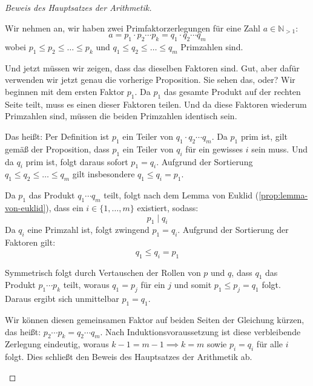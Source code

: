 \begin{proof}[Beweis des Hauptsatzes der Arithmetik]
\begin{math-stroke}
Wir nehmen an, wir haben zwei Primfaktorzerlegungen für eine Zahl $a \in \mathbb{N}_{>1}$:
\begin{equation}\label{eq:eindeutigkeit-ansatz-p3}
a = p_1 \cdot p_2 \cdots p_k = q_1 \cdot q_2 \cdots q_m
\end{equation}
wobei $p_1 \le p_2 \le \dots \le p_k$ und $q_1 \le q_2 \le \dots \le q_m$ Primzahlen sind.
\end{math-stroke}

\begin{spoken-clean}[00:53:43 - 00:56:08]
Und jetzt müssen wir zeigen, dass das dieselben Faktoren sind. Gut, aber dafür verwenden wir jetzt genau die vorherige Proposition. Sie sehen das, oder? Wir beginnen mit dem ersten Faktor $p_1$. Da $p_1$ das gesamte Produkt auf der rechten Seite teilt, muss es einen dieser Faktoren teilen. Und da diese Faktoren wiederum Primzahlen sind, müssen die beiden Primzahlen identisch sein.

Das heißt: Per Definition ist $p_1$ ein Teiler von $q_1 \cdot q_2 \cdots q_m$. Da $p_1$ prim ist, gilt gemäß der Proposition, dass $p_1$ ein Teiler von $q_i$ für ein gewisses $i$ sein muss. Und da $q_i$ prim ist, folgt daraus sofort $p_1 = q_i$. Aufgrund der Sortierung $q_1 \le q_2 \le \dots \le q_m$ gilt insbesondere $q_1 \le q_i = p_1$.
\end{spoken-clean}

\begin{math-stroke}
Da $p_1$ das Produkt $q_1 \cdots q_m$ teilt, folgt nach dem Lemma von Euklid (\cref{prop:lemma-von-euklid}), dass ein $i \in \{1, \dots, m\}$ existiert, sodass:
\[ p_1 \mid q_i \]
Da $q_i$ eine Primzahl ist, folgt zwingend $p_1 = q_i$. Aufgrund der Sortierung der Faktoren gilt:
\begin{equation}\label{eq:p1-q1-abschatzung}
q_1 \le q_i = p_1
\end{equation}
\end{math-stroke}

\begin{spoken-clean}[00:56:08 - 00:58:16]
Symmetrisch folgt durch Vertauschen der Rollen von $p$ und $q$, dass $q_1$ das Produkt $p_1 \cdots p_k$ teilt, woraus $q_1 = p_j$ für ein $j$ und somit $p_1 \le p_j = q_1$ folgt. Daraus ergibt sich unmittelbar $p_1 = q_1$.

Wir können diesen gemeinsamen Faktor auf beiden Seiten der Gleichung kürzen, das heißt: $p_2 \cdots p_k = q_2 \cdots q_m$. Nach Induktionsvoraussetzung ist diese verbleibende Zerlegung eindeutig, woraus $k - 1 = m - 1 \implies k = m$ sowie $p_i = q_i$ für alle $i$ folgt. Dies schließt den Beweis des Hauptsatzes der Arithmetik ab.


\end{spoken-clean}
\end{proof}
